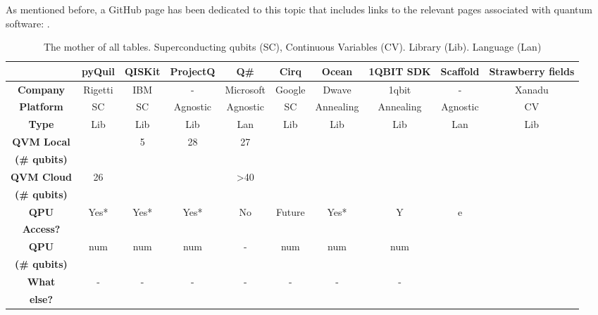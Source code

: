 As mentioned before, a GitHub page has been dedicated to this topic that includes links to the relevant pages associated with quantum software: \cite{QuantumSoftwareList}. 

\newpage
\begin{table}[h!]
\centering
\begin{tabular}{|c|c|c|c|c|c|c|c|c|c|} \hline
 & \textbf{pyQuil} & \textbf{QISKit} & \textbf{ProjectQ} & \textbf{Q\#} & \textbf{Cirq} & \textbf{Ocean} & \textbf{1QBIT SDK} & \textbf{Scaffold} & \textbf{Strawberry fields}   \\ \hline
\textbf{Company}  & Rigetti & IBM & - & Microsoft & Google & Dwave & 1qbit & - & Xanadu  \\ \hline
\textbf{Platform} & SC & SC & Agnostic & Agnostic & SC & Annealing & Annealing & Agnostic & CV   \\ \hline
\textbf{Type} & Lib & Lib & Lib & Lan & Lib & Lib & Lib & Lan & Lib  \\ \hline
\textbf{QVM Local} &  & 5 & 28 & 27 & & & &  \\ %
\textbf{(\# qubits)} &  & & & & & & & &\\ \hline %
\textbf{QVM Cloud} & 26 & & & >40 &  & & & &  \\ %
\textbf{(\# qubits)} & & & & & & & &\\ \hline %
\textbf{QPU} & \multirow{2}{*}{Yes*} & \multirow{2}{*}{Yes*} & \multirow{2}{*}{Yes*} & \multirow{2}{*}{No} & \multirow{2}{*}{Future} & \multirow{2}{*}{Yes*} & \multirow{2}{*}{Y}s :&e \\ %
\textbf{Access?} &  & & & & & & & \\ \hline %
\textbf{QPU} & \multirow{2}{*}{num} & \multirow{2}{*}{num} & \multirow{2}{*}{num} & \multirow{2}{*}{-} & \multirow{2}{*}{num} & \multirow{2}{*}{num} & \multirow{2}{*}{num} &\\ %
\textbf{(\# qubits)} & & & & & & & & \\ \hline %

\textbf{What} & \multirow{2}{*}{-} & \multirow{2}{*}{-} & \multirow{2}{*}{-} & \multirow{2}{*}{-} & \multirow{2}{*}{-} & \multirow{2}{*}{-} & \multirow{2}{*}{-} &\\ %
\textbf{else?} & & & & & & & &\\ \hline %
\end{tabular}
\caption{The mother of all tables. Superconducting qubits (SC), Continuous Variables (CV). Library (Lib). Language (Lan)}
\label{tab:mother}
\end{table}

